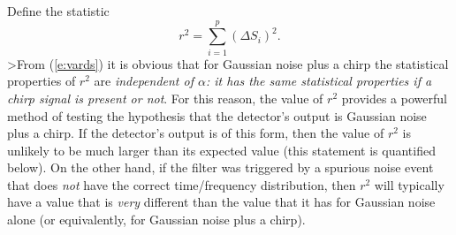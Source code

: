 Define the statistic 
\begin{equation}
r^2 = \sum_{i=1}^p (\Delta S_i)^2.
\end{equation}
>From (\ref{e:vards}) it is obvious that for Gaussian noise plus a chirp
the statistical properties of $r^2$ are {\it independent of $\alpha$:
it has the same statistical properties if a chirp signal is present
or not}.  For this reason, the value of $r^2$ provides a powerful method
of testing the hypothesis that the detector's output is Gaussian noise
plus a chirp.  If the detector's output is of this form, then the value
of $r^2$ is unlikely to be much larger than its expected value (this
statement is quantified below).  On the other hand, if the filter was
triggered by a spurious noise event that does {\it not} have the correct
time/frequency distribution, then $r^2$ will typically have a value that
is {\it very} different than the value that it has for Gaussian noise
alone (or equivalently, for Gaussian noise plus a chirp).

